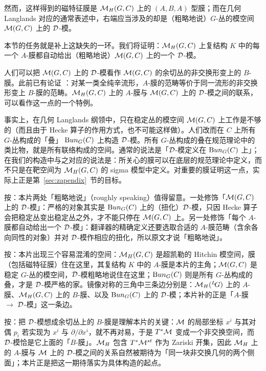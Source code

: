 然而，这样得到的磁特征膜是 $\MH(G,C)$ 上的 $(A,B,A)$ 型膜；而在几何 Langlands 对应的通常表述中，右端应当涉及的却是（粗略地说）$G$-丛的模空间 $\M(G,C)$ 上的 ${\cal D}$-模。

本节的任务就是补上这缺失的一环。我们将证明：$\MH(G,C)$ 上复结构 $K$ 中的每一个 $A$-膜都自动给出（粗略地说）$\M(G,C)$ 上的一个 ${\cal D}$-模。

人们可以把 $\M(G,C)$ 上的 ${\cal D}$-模看作 $\M(G,C)$ 的余切丛的非交换形变上的 $B$-膜。此前已有论证 \cite{ref41}：对某一类全纯辛流形，$A$-膜的范畴等价于同一流形的非交换形变上 $B$-膜的范畴。$\MH(G,C)$ 上的 $A$-膜与 $\M(G,C)$ 上的 ${\cal D}$-模之间的联系，可以看作这一点的一个特例。

事实上，在几何 Langlands 纲领中，只在稳定丛的模空间 $\M(G,C)$ 上工作是不够的（而且由于 Hecke 算子的作用方式，也不可能这样做）。人们改而在 $C$ 上所有 $G$-丛构成的「叠」 ${\rm Bun}_G(C)$ 上构造 ${\cal D}$-模。所有 $G$-丛构成的叠在规范理论中的类比物，就是所有联络构成的空间。通常的说法是「${\cal D}$-模定义在 ${\rm Bun}_G(C)$ 上」；在我们的构造中与之对应的说法是：所关心的膜可以在底层的规范理论中定义，而不只是在靶空间为 $\MH(G,C)$ 的 sigma 模型中定义。对重要的膜证明这一点，实际上正是第~\ref{sec:zapendix}~节的目标。

\begin{yizhu}[含糊点拨]
按：本片两处「粗略地说」（roughly speaking）值得留意。一处修饰「$\M(G,C)$ 上的 ${\cal D}$-模」：严格的对象其实是 ${\rm Bun}_G(C)$ 上的（扭化）${\cal D}$-模，只因 Hecke 算子会把稳定丛变出稳定丛之外，才不能只停在 $\M(G,C)$ 上。另一处修饰「每个 $A$-膜都自动给出一个 ${\cal D}$-模」：翻译器的精确定义还要选取合适的 $A$-膜范畴（含余各向同性的对象）并对 ${\cal D}$-模作相应的扭化，所以原文才说「粗略地说」。
\end{yizhu}

\begin{yizhu}[易错点]
按：本片出现三个容易混淆的空间：$\MH(G,C)$ 是超凯勒的 Hitchin 模空间，膜（包括磁特征膜）住在这里，其复结构 $K$ 中的 $A$-膜是本片的主角；$\M(G,C)$ 是稳定 $G$-丛的模空间，${\cal D}$-模粗略地说住在这里；${\rm Bun}_G(C)$ 则是所有 $G$-丛构成的叠，才是 ${\cal D}$-模严格的家。镜像对称的三角中三条边分别是：$\MH({}^L\negthinspace G)$ 上的 $A$-膜、$\MH(G,C)$ 上的 $B$-膜、以及 ${\rm Bun}_G(C)$ 上的 ${\cal D}$-模；本片补的正是「$A$-膜 $\to$ ${\cal D}$-模」这一条边。
\end{yizhu}

\begin{yizhu}[物理图像]
按：把 ${\cal D}$-模想成余切丛上的 $B$-膜是理解本片的关键：$\M$ 的局部坐标 $x^i$ 与其对偶 $p_i$ 若实现为 $x^i$ 与 $\partial/\partial x^i$，就不再对易，于是 $T^*\M$ 变成一个非交换空间，而 ${\cal D}$-模恰是它上面的「$B$-膜」。$\MH$ 包含 $T^*\M^{st}$ 作为 Zariski 开集，因此 $\MH$ 上的 $A$-膜与 $\M$ 上的 ${\cal D}$-模之间的关系自然被期待为「同一块非交换几何的两个侧面」；本片正是把这一期待落实为具体构造的起点。
\end{yizhu}

